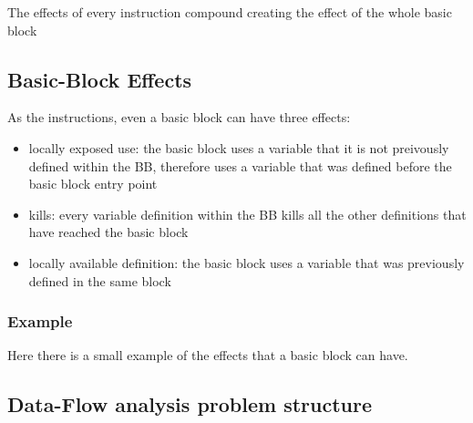 \documentclass{article}
\begin{document}
The effects of every instruction compound creating the effect of the whole basic block

\subsection{Basic-Block Effects}

As the instructions, even a basic block can have three effects:

\begin{itemize}
    \item locally exposed use: the basic block uses a variable that it is not preivously defined within the BB, therefore uses a variable that was defined before the basic block entry point
    \item kills: every variable definition within the BB kills all the other definitions that have reached the basic block
    \item locally available definition: the basic block uses a variable that was previously defined in the same block
\end{itemize}

\subsubsection{Example}

Here there is a small example of the effects that a basic block can have.


\subsection{Data-Flow analysis problem structure}
\end{document}
